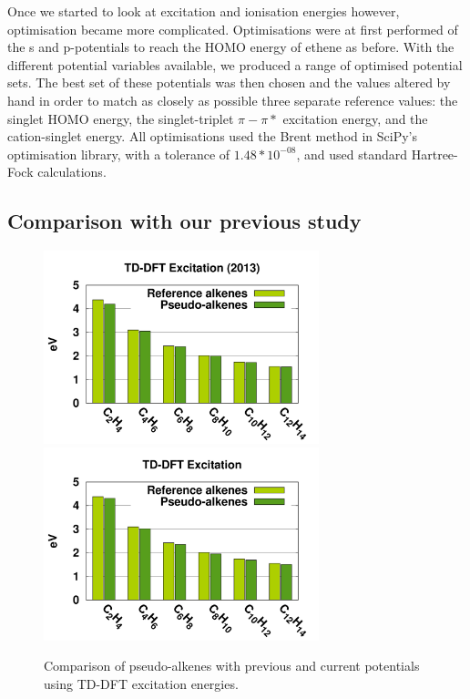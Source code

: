 \documentclass[aip]{revtex4-1}
\begin{document}
Once we started to look at excitation and ionisation energies however, optimisation became more complicated. Optimisations were at first performed of the s and p-potentials to reach the HOMO energy of ethene as before. With the different potential variables available, we produced a range of optimised potential sets. The best set of these potentials was then chosen and the values altered by hand in order to match as closely as possible three separate reference values: the singlet HOMO energy, the singlet-triplet \(\pi-\pi*\) excitation energy, and the cation-singlet energy. All optimisations used the Brent method in SciPy's optimisation library, with a tolerance of \(1.48*10^{-08}\), and used standard Hartree-Fock calculations.\cite{scipy}

\subsection{Comparison with our previous study}
\begin{figure}
\begin{center}
\includegraphics[width=8cm]{short_pbe0_tddft_2013}
\includegraphics[width=8cm]{short_pbe0_tddft}
\end{center}
\caption{Comparison of pseudo-alkenes with previous\cite{drujon_pseudopotentials_2013} and current potentials using TD-DFT excitation energies.}
\label{fig:alkenes_tddft}
\end{figure}
\end{document}
